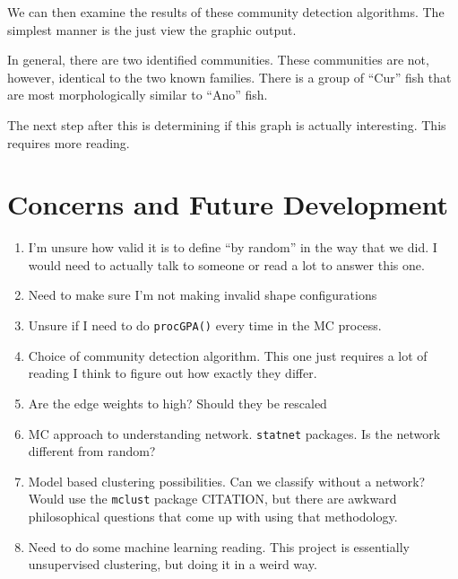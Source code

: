\documentclass{article}\usepackage{graphicx, color}
\begin{document}
We can then examine the results of these community detection algorithms. 
The simplest manner is the just view the graphic output.




In general, there are two identified communities.
These communities are not, however, identical to the two known families.
There is a group of ``Cur'' fish that are most morphologically similar to ``Ano'' fish.

The next step after this is determining if this graph is actually interesting.
This requires more reading.

\section{Concerns and Future Development}
\begin{enumerate}
\item I'm unsure how valid it is to define ``by random'' in the way that we did. 
I would need to actually talk to someone or read a lot to answer this one.

\item Need to make sure I'm not making invalid shape configurations

\item Unsure if I need to do {\tt{procGPA()}} every time in the MC process.

\item Choice of community detection algorithm.
This one just requires a lot of reading I think to figure out how exactly they differ. 

\item Are the edge weights to high?
Should they be rescaled

\item MC approach to understanding network.
{\tt{statnet}} packages.
Is the network different from random?

\item Model based clustering possibilities.
Can we classify without a network?
Would use the {\tt{mclust}} package CITATION, but there are awkward philosophical questions that come up with using that methodology.

\item Need to do some machine learning reading.
This project is essentially unsupervised clustering, but doing it in a weird way.

\end{enumerate}
\end{document}
